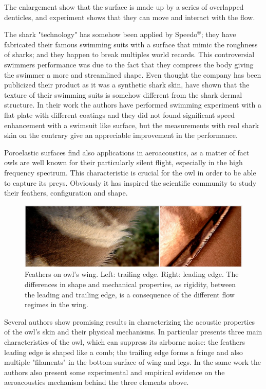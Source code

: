 The enlargement show that the surface is made up by a series of overlapped denticles, and experiment shows that they can move and interact with the flow.

The shark "technology" has somehow been applied by Speedo$^{\circledR}$; they have fabricated their famous swimming suits with a surface that mimic the roughness of sharks; and they happen to break multiples world records.
This controversial swimmers performance was due to the fact that they compress the body giving the swimmer a more and streamlined shape.
Even thought the company has been publicized their product as it was a synthetic shark skin, \citet{Oeffner785} have shown that the texture of their swimming suits is somehow different from the shark dermal structure.
In their work the authors have performed swimming experiment with a flat plate with different coatings and they did not found significant speed enhancement with a swimsuit like surface, but the measurements with real shark skin on the contrary give an appreciable improvement in the performance.

Poroelastic surfaces find also applications in aeroacoustics, as a matter of fact owls are well known for their particularly silent flight, especially in the high frequency spectrum.
This characteristic is crucial for the owl in order to be able to capture its preys.
Obviously it has inspired the scientific community to study their feathers, configuration and shape.

\begin{figure}[h]
	\centering
	\includegraphics[width=0.8\linewidth]{chapter_1/howl}
	\caption{Feathers on owl's wing. Left: trailing edge. Right: leading edge. The differences in shape and mechanical properties, as rigidity, between the leading and trailing edge, is a consequence of the different flow regimes in the wing.}
	\label{fig:owl}
\end{figure}
 
Several authors show promising results in characterizing the acoustic properties of the owl's skin and their physical mechanisms.
In particular \citet{lilley1998} presents three main characteristics of the owl, which can suppress its airborne noise: the feathers leading edge is shaped like a comb; the trailing edge forms a fringe and also multiple "filaments" in the bottom surface of wing and legs.
In the same work the authors also present some experimental and empirical evidence on the aeroacoustics mechanism behind the three elements above.

